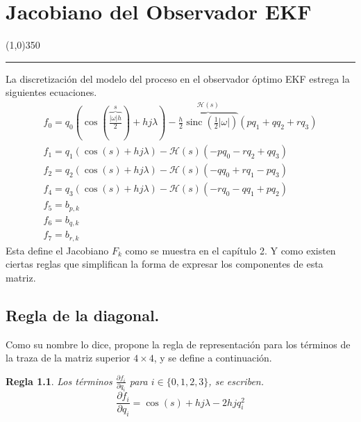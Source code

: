 \documentclass[10pt]{report}
\numberwithin{equation}{chapter}
\numberwithin{algorithm}{chapter}
\DeclareMathOperator{\sinc}{sinc}
\newtheorem{regla}{Regla}[section]
\newcommand{\parderiv}[2]{\frac{\partial #1}{\partial #2}}
\begin{document}
\printbibliography[title=Citas Bibliográficas]
\newpage
\appendix
\pagestyle{ApenStyle}
\setcounter{page}{1}
\renewcommand{\addtocontents}[2]{}
\chapter{Jacobiano del Observador EKF}\label{apen1}
\begin{center}
\line(1,0){350}\\\rule[-.4\baselineskip]{1.0\linewidth}{3.2pt}
\end{center}
\newpage
La discretización del modelo del proceso en el observador óptimo EKF estrega la siguientes ecuaciones.
\begin{gather*}
f_0=q_0(\cos(\overbrace{\frac{|\omega|h}{2}}^s)+hj\lambda)-\overbrace{\frac{h}{2}\sinc (\frac{1}{2} |\omega|)}^{\mathcal{H}(s)}(pq_1+qq_2+rq_3)\\
f_1=q_1(\cos(s)+hj\lambda)-\mathcal{H}(s) (-pq_0-rq_2+qq_3)\\
f_2=q_2(\cos(s)+hj\lambda)-\mathcal{H}(s) (-qq_0+rq_1-pq_3)\\
f_4=q_3(\cos(s)+hj\lambda)-\mathcal{H}(s) (-rq_0-qq_1+pq_2)\\
f_5=b_{p,k}\\
f_6=b_{q,k}\\
f_7=b_{r,k}
\end{gather*}
Esta define el Jacobiano $F_k$ como se muestra en el capítulo 2. Y como existen ciertas reglas que simplifican la forma de expresar los componentes de esta matriz.
\section{Regla de la diagonal.}
Como su nombre lo dice, propone la regla de representación para los términos de la traza de la matriz superior $4\times4$, y se define a continuación.
\begin{regla}
Los términos $\parderiv{f_i}{q_i}$ para $i\in\{0,1,2,3\}$, se escriben.
\begin{equation}
\parderiv{f_i}{q_i}=\cos(s)+hj\lambda-2hjq_i^2
\end{equation} 
\end{regla}
\end{document}
